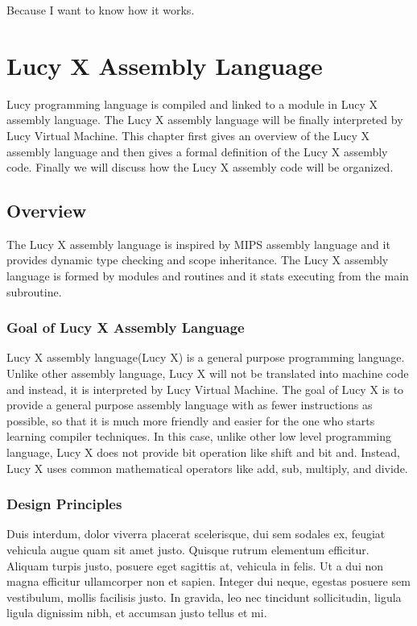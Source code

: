 \begin{savequote}[75mm]
Because I want to know how it works.
\end{savequote}

\chapter{Lucy X Assembly Language}
Lucy programming language is compiled and linked to a module in Lucy X assembly language. The Lucy X assembly language will be finally interpreted by Lucy Virtual Machine. This chapter first gives an overview of the Lucy X assembly language and then gives a formal definition of the Lucy X assembly code. Finally we will discuss how the Lucy X assembly code will be organized.

\section{Overview}
The Lucy X assembly language is inspired by MIPS assembly language and it provides dynamic type checking and scope inheritance. The Lucy X assembly language is formed by modules and routines and it stats executing from the main subroutine.

\subsection{Goal of Lucy X Assembly Language}
Lucy X assembly language(Lucy X) is a general purpose programming language. Unlike other assembly language, Lucy X will not be translated into machine code and instead, it is interpreted by Lucy Virtual Machine. The goal of Lucy X is to provide a general purpose assembly language with as fewer instructions as possible, so that it is much more friendly and easier for the one who starts learning compiler techniques. In this case, unlike other low level programming language, Lucy X does not provide bit operation like shift and bit and. Instead, Lucy X uses common mathematical operators like add, sub, multiply, and divide.

\subsection{Design Principles}
Duis interdum, dolor viverra placerat scelerisque, dui sem sodales ex, feugiat vehicula augue quam sit amet justo. Quisque rutrum elementum efficitur. Aliquam turpis justo, posuere eget sagittis at, vehicula in felis. Ut a dui non magna efficitur ullamcorper non et sapien. Integer dui neque, egestas posuere sem vestibulum, mollis facilisis justo. In gravida, leo nec tincidunt sollicitudin, ligula ligula dignissim nibh, et accumsan justo tellus et mi.

